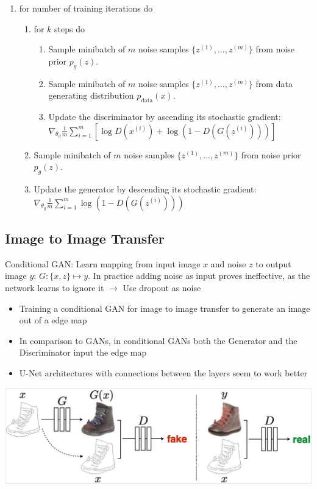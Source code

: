 \begin{enumerate}
    \item for number of training iterations do
          \begin{enumerate}
              \item for $k$ steps do
                    \begin{enumerate}
                        \item Sample minibatch of $m$ noise samples $\{z^{(1)},\ldots,z^{(m)}\}$ from noise prior $p_g(z)$.
                        \item Sample minibatch of $m$ noise samples $\{z^{(1)},\ldots,z^{(m)}\}$ from data generating distribution $p_\text{data}(x)$.
                        \item Update the discriminator by ascending its stochastic gradient:\newline $\nabla_{\theta_d} \frac{1}{m} \sum_{i=1}^m \left[\log D(x^{(i)}) + \log(1-D(G(z^{(i)})))\right]$
                    \end{enumerate}
              \item Sample minibatch of $m$ noise samples $\{z^{(1)},\ldots,z^{(m)}\}$ from noise prior $p_g(z)$.
              \item Update the generator by descending its stochastic gradient: $\nabla_{\theta_g} \frac{1}{m} \sum_{i=1}^m \log(1-D(G(z^{(i)})))$
          \end{enumerate}
\end{enumerate}

\subsection{Image to Image Transfer}
\begin{minipage}{0.5\textwidth}
    Conditional GAN: Learn mapping from input image $x$ and noise $z$ to output image $y$: $G: \{x,z\} \mapsto y$.
    In practice adding noise as input proves ineffective, as the network learns to ignore it $\rightarrow$ Use dropout as noise
    \begin{itemize}
        \item Training a conditional GAN for image to image transfer to generate an image out of a edge map
        \item In comparison to GANs, in conditional GANs both the Generator and the Discriminator input the edge map
        \item U-Net architectures with connections between the layers seem to work better
    \end{itemize}
\end{minipage}
\begin{minipage}{0.5\textwidth}
    \includegraphics[width=1\textwidth]{sections/GeneratingImages/img/cond_gan.png}
\end{minipage}


